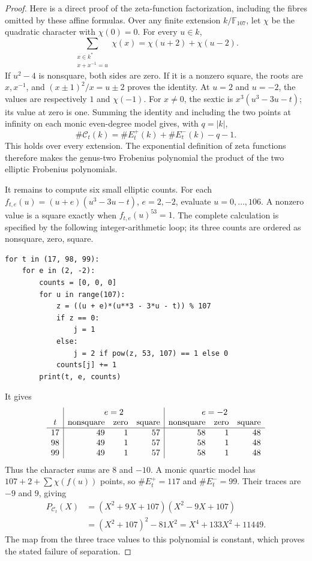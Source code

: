 \documentclass[11pt]{article}
\theoremstyle{definition}
\theoremstyle{remark}
\begin{document}
\begin{proof}
Here is a direct proof of the zeta-function factorization, including
the fibres omitted by these affine formulas. Over any finite extension
\(k/\mathbb F_{107}\), let \(\chi\) be the quadratic character
with \(\chi(0)=0\). For every \(u\in k\),
\[
 \sum_{\substack{x\in k^*\\x+x^{-1}=u}}\chi(x)
       =\chi(u+2)+\chi(u-2).
\]
If \(u^2-4\) is nonsquare, both sides are zero. If it is a nonzero
square, the roots are \(x,x^{-1}\), and
\((x\pm1)^2/x=u\pm2\) proves the identity. At \(u=2\) and
\(u=-2\), the values are respectively \(1\) and \(\chi(-1)\).
For \(x\ne0\), the sextic is
\(x^3(u^3-3u-t)\); its value at zero is one. Summing the identity
and including the two points at infinity on each monic even-degree
model gives, with \(q=|k|\),
\[
 \#\mathcal C_t(k)=\#E_t^+(k)+\#E_t^-(k)-q-1.
\]
This holds over every extension. The exponential definition of zeta
functions therefore makes the genus-two Frobenius polynomial the
product of the two elliptic Frobenius polynomials.

It remains to compute six small elliptic counts. For each
\(f_{t,e}(u)=(u+e)(u^3-3u-t)\), \(e=2,-2\), evaluate
\(u=0,\ldots,106\). A nonzero value is a square exactly when
\(f_{t,e}(u)^{53}=1\). The complete calculation is specified by
the following integer-arithmetic loop; its three counts are ordered
as nonsquare, zero, square.
\begin{small}
\begin{verbatim}
for t in (17, 98, 99):
    for e in (2, -2):
        counts = [0, 0, 0]
        for u in range(107):
            z = ((u + e)*(u**3 - 3*u - t)) % 107
            if z == 0:
                j = 1
            else:
                j = 2 if pow(z, 53, 107) == 1 else 0
            counts[j] += 1
        print(t, e, counts)
\end{verbatim}
\end{small}
It gives
\[
 \begin{array}{c|rrr|rrr}
 &\multicolumn{3}{c|}{e=2}&\multicolumn{3}{c}{e=-2}\\
 t&\text{nonsquare}&\text{zero}&\text{square}
  &\text{nonsquare}&\text{zero}&\text{square}\\ \hline
 17&49&1&57&58&1&48\\
 98&49&1&57&58&1&48\\
 99&49&1&57&58&1&48
 \end{array}
\]
Thus the character sums are \(8\) and \(-10\).
A monic quartic model has \(107+2+\sum\chi(f(u))\) points, so
\(\#E_t^+=117\) and \(\#E_t^-=99\). Their traces are
\(-9\) and \(9\), giving
\[
 \begin{aligned}
 P_{\mathcal C_t}(X)
  &=(X^2+9X+107)(X^2-9X+107)\\
  &=(X^2+107)^2-81X^2=X^4+133X^2+11449.
 \end{aligned}
\]
The map from the three trace values to this polynomial is constant,
which proves the stated failure of separation.
\end{proof}
\end{document}
